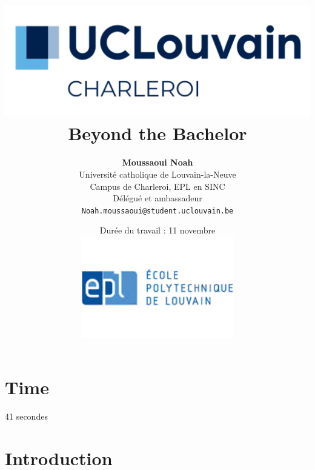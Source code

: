 \documentclass{article}
\begin{document}
\title{
    \includegraphics[width=1\textwidth]{photo/UCLouvain_Charleroi.png} \\
    \vspace{1.5cm}
    {\Huge \textbf{Beyond the Bachelor}} \\
    \vspace{1.5cm}
}

\author{
    \textbf{Moussaoui Noah} \\
    Université catholique de Louvain-la-Neuve \\
    Campus de Charleroi, EPL en SINC \\
    Délégué et ambassadeur \\
    \texttt{Noah.moussaoui@student.uclouvain.be}
}

\date{
    \vspace{1.5cm}
    Durée du travail : 11 novembre \\
    \vspace{1.5cm}
    \includegraphics[width=0.5\textwidth]{photo/EPL.png}
}

\maketitle

\section{Time}
    41 secondes 
    
\section{Introduction}
\end{document}
